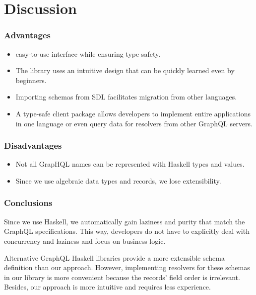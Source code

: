 \section{Discussion}

    
\begin{frame}\frametitle{Advantages}

\begin{itemize}
    \item easy-to-use interface while ensuring type safety.
    \item The library uses an intuitive design that can be quickly learned even by beginners.
    \item Importing schemas from SDL facilitates migration from other languages.
    \item A type-safe client package allows developers to implement entire applications in one language or even query data for resolvers from other GraphQL servers.
\end{itemize}

\end{frame}

\begin{frame}\frametitle{Disadvantages}

\begin{itemize}
    \item Not all GrapHQL names can be represented with Haskell types and values.
    \item Since we use algebraic data types and records, we lose extensibility.
\end{itemize}

\end{frame}

\begin{frame}\frametitle{Conclusions}
    
    Since we use Haskell, we automatically gain laziness and purity that match the GraphQL specifications. This way, developers do not have to explicitly deal with concurrency and laziness and focus on business logic. 

    Alternative GraphQL Haskell libraries provide a more extensible schema definition than our approach. However, implementing resolvers for these schemas in our library is more convenient because the records' field order is irrelevant. Besides, our approach is more intuitive and requires less experience.
    
\end{frame}

